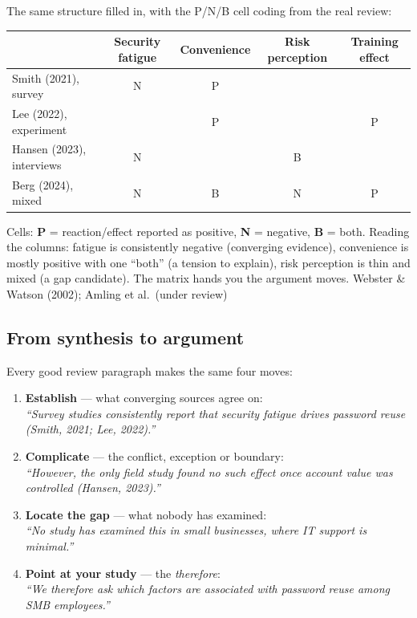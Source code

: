 \documentclass[11pt,a4paper,british,twoside=false,headings=small,chapterprefix=false,numbers=noenddot]{scrbook}
\begin{document}
\begin{center}\small
The same structure filled in, with the P/N/B cell coding from the real
  review:
  
  \footnotesize
  \renewcommand{\arraystretch}{1.3}
  \begin{tabular}{@{}p{3.0cm}cccc@{}}
    \toprule
    & \textbf{Security fatigue} & \textbf{Convenience} & \textbf{Risk perception} & \textbf{Training effect}\\
    \midrule
    Smith (2021), survey        & N & P &   & \\
    Lee (2022), experiment      &   & P &   & P\\
    Hansen (2023), interviews   & N &   & B & \\
    Berg (2024), mixed          & N & B & N & P\\
    \bottomrule
  \end{tabular}
  

  Cells: \textbf{P} = reaction/effect reported as positive, \textbf{N} =
  negative, \textbf{B} = both. Reading the columns: fatigue is consistently
  negative (converging evidence), convenience is mostly positive with one
  ``both'' (a tension to explain), risk perception is thin and mixed (a gap
  candidate). The matrix hands you the argument moves.
  \hfill {\color{kgrey}\scriptsize Webster \& Watson (2002); Amling et al.\ (under review)}
\end{center}


\subsection{From synthesis to argument}
\begin{center}\small
Every good review paragraph makes the same four moves:
  
  \small
  \begin{enumerate}\setlength{\itemsep}{0.45em}
    \item \textbf{Establish} --- what converging sources agree on:\\
          {\color{kgrey}\emph{``Survey studies consistently report that security
          fatigue drives password reuse (Smith, 2021; Lee, 2022).''}}
    \item \textbf{Complicate} --- the conflict, exception or boundary:\\
          {\color{kgrey}\emph{``However, the only field study found no such
          effect once account value was controlled (Hansen, 2023).''}}
    \item \textbf{Locate the gap} --- what nobody has examined:\\
          {\color{kgrey}\emph{``No study has examined this in small businesses,
          where IT support is minimal.''}}
    \item \textbf{Point at your study} --- the \emph{therefore}:\\
          {\color{kgrey}\emph{``We therefore ask which factors are associated
          with password reuse among SMB employees.''}}
  \end{enumerate}
\end{center}
\end{document}
